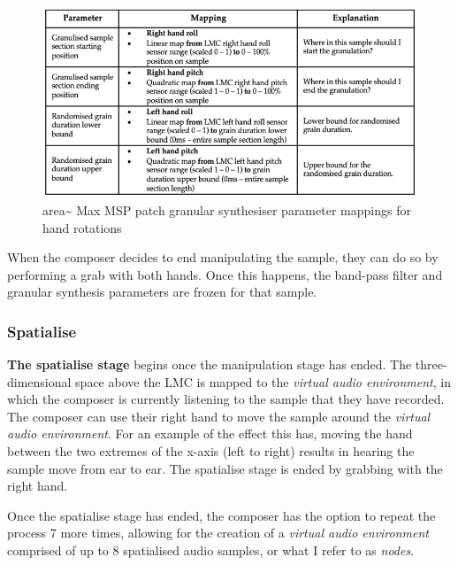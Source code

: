 \begin{figure}
    \centering
    \includegraphics[width=1\linewidth]{figures/05-area/areatechnical_param2.png}
    \caption{area\textasciitilde{} Max MSP patch granular synthesiser parameter mappings for hand rotations}
    \label{fig: areaparams2}
\end{figure}
When the composer decides to end manipulating the sample, they can do so by performing a grab with both hands. Once this happens, the band-pass filter and granular synthesis parameters are frozen for that sample.

\subsubsection{Spatialise}\label{sec: area-system-software-spatialise}
\textbf{The spatialise stage} begins once the manipulation stage has ended. The three-dimensional space above the LMC is mapped to the \textit{virtual audio environment}, in which the composer is currently listening to the sample that they have recorded. The composer can use their right hand to move the sample around the \textit{virtual audio environment}. For an example of the effect this has, moving the hand between the two extremes of the x-axis (left to right) results in hearing the sample move from ear to ear. The spatialise stage is ended by grabbing with the right hand.

Once the spatialise stage has ended, the composer has the option to repeat the process 7 more times, allowing for the creation of a \textit{virtual audio environment} comprised of up to 8 spatialised audio samples, or what I refer to as \textit{nodes}. 

